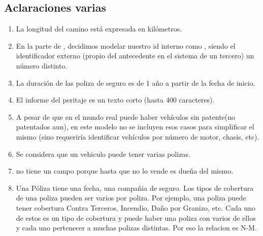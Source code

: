 \subsection{Aclaraciones varias}
\begin{enumerate}
	\item La longitud del camino está expresada en kilómetros.
	\item En la parte de , decidimos modelar nuestro id interno como , siendo el identificador externo (propio del antecedente en el sistema de un tercero) un número distinto.
	\item La duración de las poliza de seguro es de 1 año a partir de la fecha de inicio.
	\item El informe del peritaje es un texto corto (hasta 400 caracteres).
	\item A pesar de que en el mundo real puede haber vehículos sin patente(no patentados aun), en este modelo no se incluyen esos casos para simplificar el mismo (sino requeriría identificar vehículos por número de motor, chasis, etc).
	\item Se considera que un vehiculo puede tener varias polizas.
	\item {} no tiene un campo  porque hasta que no lo vende es dueña del mismo.
	\item Una Póliza tiene una fecha, una compañia de seguro. Los tipos de cobertura de una poliza pueden ser varios por poliza. Por ejemplo, una poliza puede tener cobertura Contra Terceros, Incendio, Daño por Granizo, etc. Cada uno de estos es un tipo de cobertura y puede haber una poliza con varios de ellos y cada uno pertenecer a muchas polizas distintas. Por eso la relacion es N-M.
\end{enumerate}